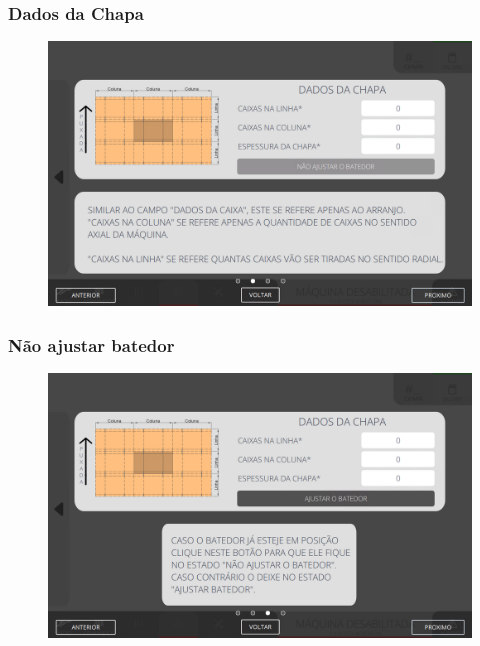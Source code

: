 \newpage
\thispagestyle{fancy}
\vspace*{40 pt}
\subsubsection{\small{Dados da Chapa}} \label{sec:telaNovoPedidoP2DadosChapa}
\vspace*{\fill}
\begin{figure}[h]
    \centering
    \includegraphics[width=576 px,height=360 px]{src/imagesICV/09-request/new/e-7.png}
\end{figure}
\vspace*{\fill}

\newpage
\thispagestyle{fancy}
\vspace*{40 pt}
\subsubsection{\small{Não ajustar batedor}} \label{sec:telaNovoPedidoP2NaoAjustarBatedor}
\vspace*{\fill}
\begin{figure}[h]
    \centering
    \includegraphics[width=576 px,height=360 px]{src/imagesICV/09-request/new/e-8-COM-ERRO-DIGITAÇÃO.png}
\end{figure}
\vspace*{\fill}

